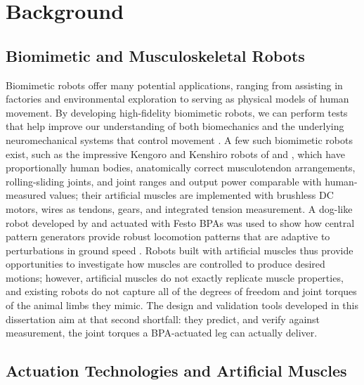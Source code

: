 \chapter{Background}\label{ch:background}

\section{Biomimetic and Musculoskeletal Robots}\label{sec:bg_robots}

Biomimetic robots offer many potential applications, ranging from assisting in factories and environmental exploration to serving as physical models of human movement. By developing high-fidelity biomimetic robots, we can perform tests that help improve our understanding of both biomechanics and the underlying neuromechanical systems that control movement \citep{shin_constructive_2018, asano_musculoskeletal_2019, ijspeert_amphibious_2020, goldsmith_investigating_2021, hunt_development_2017, schilling_adaptive_2022}. A few such biomimetic robots exist, such as the impressive Kengoro and Kenshiro robots of \citet{asano_design_2017} and \citet{asano_musculoskeletal_2019}, which have proportionally human bodies, anatomically correct musculotendon arrangements, rolling-sliding joints, and joint ranges and output power comparable with human-measured values; their artificial muscles are implemented with brushless DC motors, wires as tendons, gears, and integrated tension measurement. A dog-like robot developed by \citet{aschenbeck_design_2006} and actuated with Festo BPAs was used to show how central pattern generators provide robust locomotion patterns that are adaptive to perturbations in ground speed \citep{hunt_development_2017}. Robots built with artificial muscles thus provide opportunities to investigate how muscles are controlled to produce desired motions; however, artificial muscles do not exactly replicate muscle properties, and existing robots do not capture all of the degrees of freedom and joint torques of the animal limbs they mimic. The design and validation tools developed in this dissertation aim at that second shortfall: they predict, and verify against measurement, the joint torques a BPA-actuated leg can actually deliver.

\section{Actuation Technologies and Artificial Muscles}\label{sec:bg_actuation}

